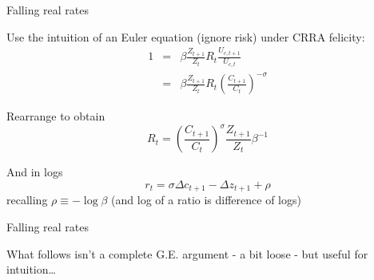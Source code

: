 	
\begin{frame}{Falling real rates}

Use the intuition of an Euler equation (ignore risk) under CRRA felicity:
\begin{eqnarray*}
1 &=& 	\beta \frac{Z_{t+1}}{Z_{t}} R_{t} \frac{U_{c,t+1}}{U_{c,t}} \\
	&=& \beta \frac{Z_{t+1}}{Z_{t}} R_{t} \left( \frac{C_{t+1}}{C_{t}} \right)^{-\sigma}
\end{eqnarray*}

Rearrange to obtain
\[
R_{t} = \left(\frac{C_{t+1}}{C_{t}}\right)^{\sigma} \frac{Z_{t+1}}{Z_{t}} \beta^{-1}
\]

And in logs
\[
r_{t} = \sigma \Delta c_{t+1} - \Delta z_{t+1} + \rho
\]
recalling $\rho \equiv -\log{\beta}$ (and log of a ratio is difference of logs)

\end{frame}


	
\begin{frame}{Falling real rates}

What follows isn't a complete G.E. argument - a bit loose - but useful for intuition\ldots

\end{frame}


	
